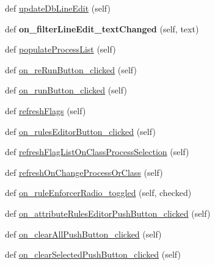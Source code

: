 \begin{DoxyCompactItemize}
\item 
def \mbox{\hyperlink{class_dsg_tools_1_1_validation_tools_1_1validation__toolbox_1_1_validation_toolbox_a985173fe2285c3894ab3800d94e10fd0}{update\+Db\+Line\+Edit}} (self)
\item 
\mbox{\label{class_dsg_tools_1_1_validation_tools_1_1validation__toolbox_1_1_validation_toolbox_a932307ede7506269ff79be077974092e}} 
def {\bfseries on\+\_\+filter\+Line\+Edit\+\_\+text\+Changed} (self, text)
\item 
def \mbox{\hyperlink{class_dsg_tools_1_1_validation_tools_1_1validation__toolbox_1_1_validation_toolbox_a60c2886f451186f458452f26fd8517f1}{populate\+Process\+List}} (self)
\item 
def \mbox{\hyperlink{class_dsg_tools_1_1_validation_tools_1_1validation__toolbox_1_1_validation_toolbox_a2ea4455fafc4a0320247fc7bedc365d0}{on\+\_\+re\+Run\+Button\+\_\+clicked}} (self)
\item 
def \mbox{\hyperlink{class_dsg_tools_1_1_validation_tools_1_1validation__toolbox_1_1_validation_toolbox_ac5d69157311a2735179d6d6c5cc97619}{on\+\_\+run\+Button\+\_\+clicked}} (self)
\item 
def \mbox{\hyperlink{class_dsg_tools_1_1_validation_tools_1_1validation__toolbox_1_1_validation_toolbox_a6d976bd8898c775b1f3a68a2299fcb2a}{refresh\+Flags}} (self)
\item 
def \mbox{\hyperlink{class_dsg_tools_1_1_validation_tools_1_1validation__toolbox_1_1_validation_toolbox_a22c31b303e83389111742981e490eaad}{on\+\_\+rules\+Editor\+Button\+\_\+clicked}} (self)
\item 
def \mbox{\hyperlink{class_dsg_tools_1_1_validation_tools_1_1validation__toolbox_1_1_validation_toolbox_aabc3539ed5006b88a9d99263769fcf30}{refresh\+Flag\+List\+On\+Class\+Process\+Selection}} (self)
\item 
def \mbox{\hyperlink{class_dsg_tools_1_1_validation_tools_1_1validation__toolbox_1_1_validation_toolbox_ae1a925049c04e40014efcac2cbb4ec8c}{refresh\+On\+Change\+Process\+Or\+Class}} (self)
\item 
def \mbox{\hyperlink{class_dsg_tools_1_1_validation_tools_1_1validation__toolbox_1_1_validation_toolbox_ae5b900e85a52452c3736f6f380e57d17}{on\+\_\+rule\+Enforcer\+Radio\+\_\+toggled}} (self, checked)
\item 
def \mbox{\hyperlink{class_dsg_tools_1_1_validation_tools_1_1validation__toolbox_1_1_validation_toolbox_ad33583168503d8be644e2fd130c4b2b0}{on\+\_\+attribute\+Rules\+Editor\+Push\+Button\+\_\+clicked}} (self)
\item 
def \mbox{\hyperlink{class_dsg_tools_1_1_validation_tools_1_1validation__toolbox_1_1_validation_toolbox_a432d54a99a98cbfe5a947839bdbf7b59}{on\+\_\+clear\+All\+Push\+Button\+\_\+clicked}} (self)
\item 
def \mbox{\hyperlink{class_dsg_tools_1_1_validation_tools_1_1validation__toolbox_1_1_validation_toolbox_aea049950dc68fe76461c057baac3401f}{on\+\_\+clear\+Selected\+Push\+Button\+\_\+clicked}} (self)
\end{DoxyCompactItemize}
